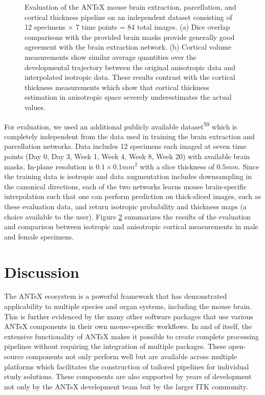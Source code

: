 \documentclass[
  12pt,
]{article}
\begin{document}
\begin{figure}
\begin{subfigure}{.5\textwidth}
  \caption{}
  \label{fig:subc}
\end{subfigure}
\caption{Evaluation of the ANTsX mouse brain extraction, parcellation, and
cortical thickness pipeline on an independent dataset 
consisting of 12 specimens $\times$ 7 time points = 
84 total images.  (a) Dice overlap comparisons with the provided brain
masks provide generally good agreement with the brain extraction network.
(b) Cortical volume measurements show similar average quantities over
the developmental trajectory between the original anisotropic data and 
interpolated isotropic data.  These results contrast with the cortical
thickness measurements which show that cortical thickness estimation 
in anisotropic space severely underestimates the actual values.}
\label{fig:evaluation}
\end{figure}

For evaluation, we used an additional publicly available
dataset\textsuperscript{59} which is completely independent from the
data used in training the brain extraction and parcellation networks.
Data includes 12 specimens each imaged at seven time points (Day 0, Day
3, Week 1, Week 4, Week 8, Week 20) with available brain masks. In-plane
resolution is \(0.1 \times 0.1 mm^2\) with a slice thickness of
\(0.5 mm\). Since the training data is isotropic and data augmentation
includes downsampling in the canonical directions, each of the two
networks learns mouse brain-specific interpolation such that one can
perform prediction on thick-sliced images, such as these evaluation
data, and return isotropic probability and thickness maps (a choice
available to the user). Figure \ref{fig:evaluation} summarizes the
results of the evaluation and comparison between isotropic and
anisotropic cortical measurements in male and female specimens.

\clearpage
\newpage

\hypertarget{discussion}{%
\section{Discussion}\label{discussion}}

The ANTsX ecosystem is a powerful framework that has demonstrated
applicability to multiple species and organ systems, including the mouse
brain. This is further evidenced by the many other software packages
that use various ANTsX components in their own mouse-specific workflows.
In and of itself, the extensive functionality of ANTsX makes it possible
to create complete processing pipelines without requiring the
integration of multiple packages. These open-source components not only
perform well but are available across multiple platforms which
facilitates the construction of tailored pipelines for individual study
solutions. These components are also supported by years of development
not only by the ANTsX development team but by the larger ITK community.
\end{document}
